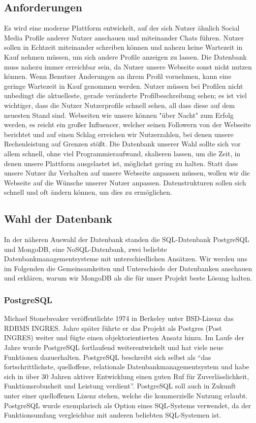 \subsection{Anforderungen}
Es wird eine moderne Plattform entwickelt, auf der sich Nutzer ähnlich Social Media Profile anderer Nutzer anschauen und miteinander Chats führen. Nutzer sollen in Echtzeit miteinander schreiben können und nahezu keine Wartezeit in Kauf nehmen müssen, um sich andere Profile anzeigen zu lassen. Die Datenbank muss nahezu immer erreichbar sein, da Nutzer unsere Webseite sonst nicht nutzen können. 
Wenn Benutzer Änderungen an ihrem Profil vornehmen, kann eine geringe Wartezeit in Kauf genommen werden. Nutzer müssen bei Profilen nicht unbedingt die aktuelleste, gerade veränderte Profilbeschreibung sehen; es ist viel wichtiger, dass die Nutzer Nutzerprofile schnell sehen, all dass diese auf dem neuesten Stand sind. 
Webseiten wie unsere können "über Nacht" zum Erfolg werden, es reicht ein großer Influencer, welcher seinen Followern von der Webseite berichtet und auf einen Schlag erreichen wir Nutzerzahlen, bei denen unsere Rechenleistung auf Grenzen stößt. Die Datenbank unserer Wahl sollte sich vor allem schnell, ohne viel Programmieraufwand, skalieren lassen, um die Zeit, in denen unsere Plattform ausgelastet ist, möglichst gering zu halten. 
Statt dass unsere Nutzer ihr Verhalten auf unsere Webseite anpassen müssen, wollen wir die Webseite auf die Wünsche unserer Nutzer anpassen. Datenstrukturen sollen sich schnell und oft ändern können, um dies zu ermöglichen.

\subsection{Wahl der Datenbank}
In der näheren Auswahl der Datenbank standen die SQL-Datenbank PostgreSQL und MongoDB, eine NoSQL-Datenbank, zwei beliebte Datenbankmanagementsysteme mit unterschiedlichen Ansätzen. Wir werden uns im Folgenden die Gemeinsamkeiten und Unterschiede der Datenbanken anschauen und erklären, warum wir MongoDB als die für unser Projekt beste Lösung halten.

\subsubsection{PostgreSQL}
Michael Stonebreaker veröffentlichte 1974 in Berkeley unter BSD-Lizenz das RDBMS INGRES. Jahre später führte er das Projekt als Postgres (Post INGRES) weiter und fügte einen objektorientierten Ansatz hinzu. \cite{PG1} Im Laufe der Jahre wurde PostgreSQL fortlaufend weiterentwickelt und hat viele neue Funktionen dazuerhalten.
PostgreSQL beschreibt sich selbst als \enquote{das fortschrittlichste, quelloffene, relationale Datenbankmanagementsystem und habe sich in über 30 Jahren aktiver Entwicklung einen guten Ruf für Zuverlässlichkeit, Funktionsrobusheit und Leistung verdient}. \cite{PG2} PostgreSQL soll auch in Zukunft unter einer quelloffenen Lizenz stehen, welche die kommerzielle Nutzung erlaubt. \cite{PG3}
PostgreSQL wurde exemplarisch als Option eines SQL-Systems verwendet, da der Funktionsumfang vergleichbar mit anderen beliebten SQL-Systemen ist. \cite{PG4}

